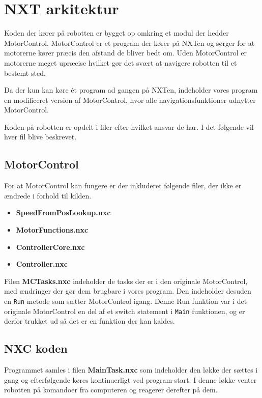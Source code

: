 \section{NXT arkitektur}
Koden der kører på robotten er bygget op omkring et modul der hedder MotorControl. \cite{MotorControl}
MotorControl er et program der kører på NXTen og sørger for at motorerne kører præcis den afstand de bliver bedt om. 
Uden MotorControl er motorerne meget upræcise hvilket gør det svært at navigere robotten til et bestemt sted.

Da der kun kan køre ét program ad gangen på NXTen, indeholder vores program en modificeret version af MotorControl, hvor alle navigationsfunktioner udnytter MotorControl.

Koden på robotten er opdelt i filer efter hvilket ansvar de har.
I det følgende vil hver fil blive beskrevet.

\subsection{MotorControl}
For at MotorControl kan fungere er der inkluderet følgende filer, der ikke er ændrede i forhold til kilden.

\begin{itemize}
\item \textbf{SpeedFromPosLookup.nxc}
\item \textbf{MotorFunctions.nxc}
\item \textbf{ControllerCore.nxc}
\item \textbf{Controller.nxc}
\end{itemize}

Filen \textbf{MCTasks.nxc} indeholder de tasks der er i den originale MotorControl, med ændringer der gør dem brugbare i vores program.
Den indeholder desuden en \lstinline[style=c]!Run! metode som sætter MotorControl igang. 
Denne Run funktion var i det originale MotorControl en del af et switch statement i \lstinline[style=c]!Main! funktionen, og er derfor trukket ud så det er en funktion der kan kaldes.

\subsection{NXC koden}

Programmet samles i filen \textbf{MainTask.nxc} som indeholder den løkke der sættes i gang og efterfølgende køres kontinuerligt ved program-start. 
I denne løkke venter robotten på komandoer fra computeren og reagerer derefter på dem.

